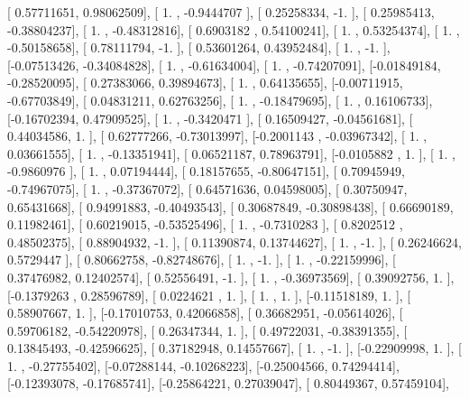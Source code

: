 \documentclass{article}
\begin{document}
       [ 0.57711651,  0.98062509],
       [ 1.        , -0.9444707 ],
       [ 0.25258334, -1.        ],
       [ 0.25985413, -0.38804237],
       [ 1.        , -0.48312816],
       [ 0.6903182 ,  0.54100241],
       [ 1.        ,  0.53254374],
       [ 1.        , -0.50158658],
       [ 0.78111794, -1.        ],
       [ 0.53601264,  0.43952484],
       [ 1.        , -1.        ],
       [-0.07513426, -0.34084828],
       [ 1.        , -0.61634004],
       [ 1.        , -0.74207091],
       [-0.01849184, -0.28520095],
       [ 0.27383066,  0.39894673],
       [ 1.        ,  0.64135655],
       [-0.00711915, -0.67703849],
       [ 0.04831211,  0.62763256],
       [ 1.        , -0.18479695],
       [ 1.        ,  0.16106733],
       [-0.16702394,  0.47909525],
       [ 1.        , -0.3420471 ],
       [ 0.16509427, -0.04561681],
       [ 0.44034586,  1.        ],
       [ 0.62777266, -0.73013997],
       [-0.2001143 , -0.03967342],
       [ 1.        ,  0.03661555],
       [ 1.        , -0.13351941],
       [ 0.06521187,  0.78963791],
       [-0.0105882 ,  1.        ],
       [ 1.        , -0.9860976 ],
       [ 1.        ,  0.07194444],
       [ 0.18157655, -0.80647151],
       [ 0.70945949, -0.74967075],
       [ 1.        , -0.37367072],
       [ 0.64571636,  0.04598005],
       [ 0.30750947,  0.65431668],
       [ 0.94991883, -0.40493543],
       [ 0.30687849, -0.30898438],
       [ 0.66690189,  0.11982461],
       [ 0.60219015, -0.53525496],
       [ 1.        , -0.7310283 ],
       [ 0.8202512 ,  0.48502375],
       [ 0.88904932, -1.        ],
       [ 0.11390874,  0.13744627],
       [ 1.        , -1.        ],
       [ 0.26246624,  0.5729447 ],
       [ 0.80662758, -0.82748676],
       [ 1.        , -1.        ],
       [ 1.        , -0.22159996],
       [ 0.37476982,  0.12402574],
       [ 0.52556491, -1.        ],
       [ 1.        , -0.36973569],
       [ 0.39092756,  1.        ],
       [-0.1379263 ,  0.28596789],
       [ 0.0224621 ,  1.        ],
       [ 1.        ,  1.        ],
       [-0.11518189,  1.        ],
       [ 0.58907667,  1.        ],
       [-0.17010753,  0.42066858],
       [ 0.36682951, -0.05614026],
       [ 0.59706182, -0.54220978],
       [ 0.26347344,  1.        ],
       [ 0.49722031, -0.38391355],
       [ 0.13845493, -0.42596625],
       [ 0.37182948,  0.14557667],
       [ 1.        , -1.        ],
       [-0.22909998,  1.        ],
       [ 1.        , -0.27755402],
       [-0.07288144, -0.10268223],
       [-0.25004566,  0.74294414],
       [-0.12393078, -0.17685741],
       [-0.25864221,  0.27039047],
       [ 0.80449367,  0.57459104],
\end{document}
